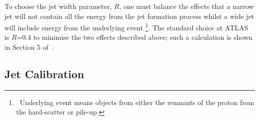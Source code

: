 To choose the jet width parameter, $R$, one must balance the effects that
a narrow jet will not contain all the energy from the jet formation process
whilst a wide jet will include energy from the underlying event \footnote{\  Underlying event means objects from either the remnants of the proton from the hard-scatter or pile-up.}.
The standard choice at ATLAS is $R$=0.4 to minimise the  two effects described above;
such a calculation is shown in Section 5 of~\cite{obj-jets_reco_salam}.


\subsection{Jet Calibration}
\label{sec:obj-jets_calib}

